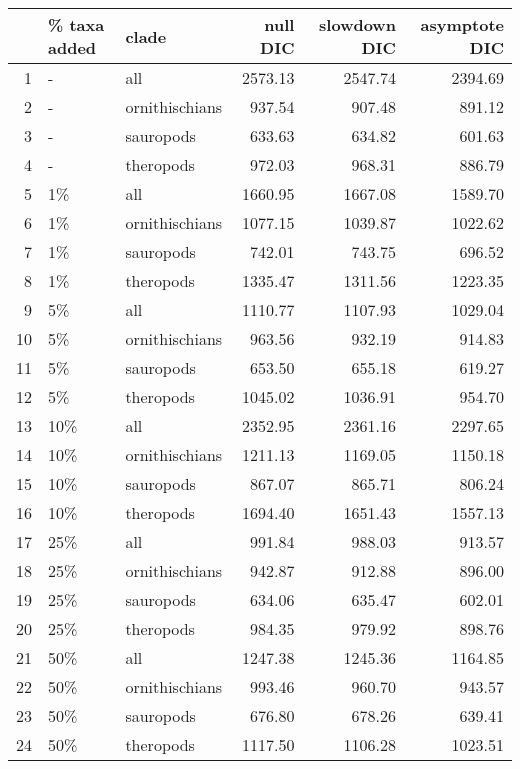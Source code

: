 \begin{table}[ht]
\centering
\begin{tabular}{rllrrr}
  \hline
 & \% taxa added & clade & null DIC & slowdown DIC & asymptote DIC \\ 
  \hline
1 & - & all & 2573.13 & 2547.74 & 2394.69 \\ 
  2 & - & ornithischians & 937.54 & 907.48 & 891.12 \\ 
  3 & - & sauropods & 633.63 & 634.82 & 601.63 \\ 
  4 & - & theropods & 972.03 & 968.31 & 886.79 \\ 
  5 & 1\% & all & 1660.95 & 1667.08 & 1589.70 \\ 
  6 & 1\% & ornithischians & 1077.15 & 1039.87 & 1022.62 \\ 
  7 & 1\% & sauropods & 742.01 & 743.75 & 696.52 \\ 
  8 & 1\% & theropods & 1335.47 & 1311.56 & 1223.35 \\ 
  9 & 5\% & all & 1110.77 & 1107.93 & 1029.04 \\ 
  10 & 5\% & ornithischians & 963.56 & 932.19 & 914.83 \\ 
  11 & 5\% & sauropods & 653.50 & 655.18 & 619.27 \\ 
  12 & 5\% & theropods & 1045.02 & 1036.91 & 954.70 \\ 
  13 & 10\% & all & 2352.95 & 2361.16 & 2297.65 \\ 
  14 & 10\% & ornithischians & 1211.13 & 1169.05 & 1150.18 \\ 
  15 & 10\% & sauropods & 867.07 & 865.71 & 806.24 \\ 
  16 & 10\% & theropods & 1694.40 & 1651.43 & 1557.13 \\ 
  17 & 25\% & all & 991.84 & 988.03 & 913.57 \\ 
  18 & 25\% & ornithischians & 942.87 & 912.88 & 896.00 \\ 
  19 & 25\% & sauropods & 634.06 & 635.47 & 602.01 \\ 
  20 & 25\% & theropods & 984.35 & 979.92 & 898.76 \\ 
  21 & 50\% & all & 1247.38 & 1245.36 & 1164.85 \\ 
  22 & 50\% & ornithischians & 993.46 & 960.70 & 943.57 \\ 
  23 & 50\% & sauropods & 676.80 & 678.26 & 639.41 \\ 
  24 & 50\% & theropods & 1117.50 & 1106.28 & 1023.51 \\ 
   \hline
\end{tabular}
\caption{} 
\end{table}

